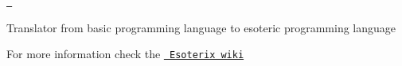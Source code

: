 \href{https://www.codefactor.io/repository/github/maelbecel/esoterix}{\texttt{ }}

Translator from basic programming language to esoteric programming language

For more information check the \href{https://github.com/maelbecel/Esoterix/wiki}{\texttt{ Esoterix wiki}} 